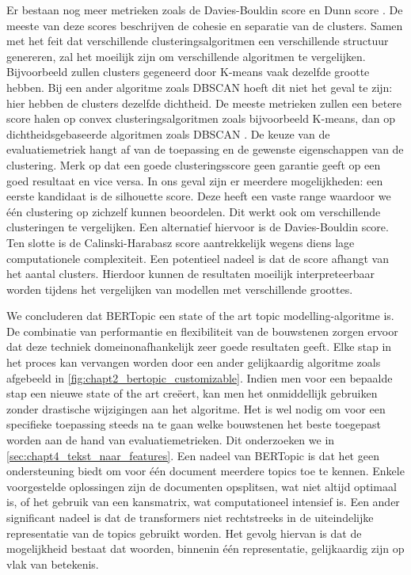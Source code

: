 Er bestaan nog meer metrieken zoals de Davies-Bouldin score \cite{davies_bouldin_paper} en Dunn score \cite{dunn_paper}. De meeste van deze scores beschrijven de cohesie en separatie van de clusters. Samen met het feit dat verschillende clusteringsalgoritmen een verschillende structuur genereren, zal het moeilijk zijn om verschillende algoritmen te vergelijken. Bijvoorbeeld zullen clusters gegeneerd door K-means vaak dezelfde grootte hebben. \cite{cursus_ML_unsupervised} Bij een ander algoritme zoals DBSCAN hoeft dit niet het geval te zijn: hier hebben de clusters dezelfde dichtheid. De meeste metrieken zullen een betere score halen op convex clusteringsalgoritmen zoals bijvoorbeeld K-means, dan op dichtheidsgebaseerde algoritmen zoals DBSCAN \cite{eval_metrics_scikit}. De keuze van de evaluatiemetriek hangt af van de toepassing en de gewenste eigenschappen van de clustering. Merk op dat een goede clusteringsscore geen garantie geeft op een goed resultaat en vice versa.\newline
In ons geval zijn er meerdere mogelijkheden: een eerste kandidaat is de silhouette score. Deze heeft een vaste range waardoor we één clustering op zichzelf kunnen beoordelen. Dit werkt ook om verschillende clusteringen te vergelijken. Een alternatief hiervoor is de Davies-Bouldin score. Ten slotte is de Calinski-Harabasz score aantrekkelijk wegens diens lage computationele complexiteit. Een potentieel nadeel is dat de score afhangt van het aantal clusters. Hierdoor kunnen de resultaten moeilijk interpreteerbaar worden tijdens het vergelijken van modellen met verschillende groottes.

We concluderen dat BERTopic een state of the art topic modelling-algoritme is. De combinatie van performantie en flexibiliteit van de bouwstenen zorgen ervoor dat deze techniek domeinonafhankelijk zeer goede resultaten geeft. Elke stap in het proces kan vervangen worden door een ander gelijkaardig algoritme zoals afgebeeld in \autoref{fig:chapt2_bertopic_customizable}. Indien men voor een bepaalde stap een nieuwe state of the art creëert, kan men het onmiddellijk gebruiken zonder drastische wijzigingen aan het algoritme. Het is wel nodig om voor een specifieke toepassing steeds na te gaan welke bouwstenen het beste toegepast worden aan de hand van evaluatiemetrieken. Dit onderzoeken we in \autoref{sec:chapt4_tekst_naar_features}. \newline
Een nadeel van BERTopic is dat het geen ondersteuning biedt om voor één document meerdere topics toe te kennen. Enkele voorgestelde oplossingen zijn de documenten opsplitsen, wat niet altijd optimaal is, of het gebruik van een kansmatrix, wat computationeel intensief is. Een ander significant nadeel is dat de transformers niet rechtstreeks in de uiteindelijke representatie van de topics gebruikt worden. Het gevolg hiervan is dat de mogelijkheid bestaat dat woorden, binnenin één representatie, gelijkaardig zijn op vlak van betekenis.


